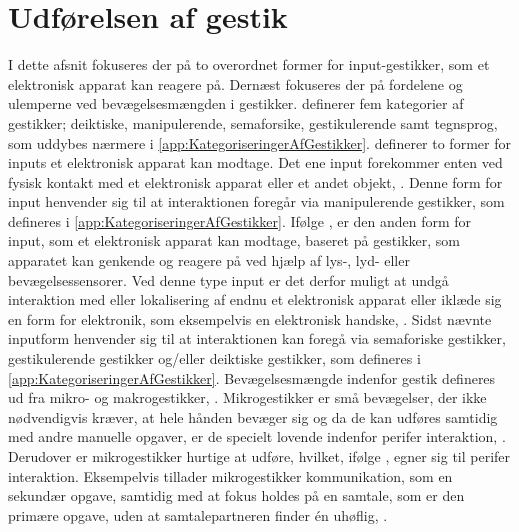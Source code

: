 \section{Udførelsen af gestik}
\label{UdfoerelseAfGestik}
%
I dette afsnit fokuseres der på to overordnet former for input-gestikker, som et elektronisk apparat kan reagere på. Dernæst fokuseres der på fordelene og ulemperne ved bevægelsesmængden i gestikker. \textcite[s. 9]{PDF:ATaxonomyOfGestures} definerer fem kategorier af gestikker; deiktiske, manipulerende, semaforsike, gestikulerende samt tegnsprog, som uddybes nærmere i \autoref{app:KategoriseringerAfGestikker}. \blankline
%
\textcite[s. 9]{PDF:ATaxonomyOfGestures} definerer to former for inputs et elektronisk apparat kan modtage. Det ene input forekommer enten ved fysisk kontakt med et elektronisk apparat eller et andet objekt, \parencite[s. 10]{PDF:ATaxonomyOfGestures}. Denne form for input henvender sig til at interaktionen foregår via manipulerende gestikker, som defineres i \autoref{app:KategoriseringerAfGestikker}. Ifølge \textcite[s. 12]{PDF:ATaxonomyOfGestures}, er den anden form for input, som et elektronisk apparat kan modtage, baseret på gestikker, som apparatet kan genkende og reagere på ved hjælp af lys-, lyd- eller bevægelsessensorer. Ved denne type input er det derfor muligt at undgå interaktion med eller lokalisering af endnu et elektronisk apparat eller iklæde sig en form for elektronik, som eksempelvis en elektronisk handske, \parencite[s. 12]{PDF:ATaxonomyOfGestures}. Sidst nævnte inputform henvender sig til at interaktionen kan foregå via semaforiske gestikker, gestikulerende gestikker og/eller deiktiske gestikker, som defineres i \autoref{app:KategoriseringerAfGestikker}. \blankline
%
Bevægelsesmængde indenfor gestik defineres ud fra mikro- og makrogestikker, \parencite[s. 6]{PDF:UsabilityofMicroVsMacroGestures}. Mikrogestikker er små bevægelser, der ikke nødvendigvis kræver, at hele hånden bevæger sig og da de kan udføres samtidig med andre manuelle opgaver, er de specielt lovende indenfor perifer interaktion, \parencite[s. 95]{PDF:PIMicrogesturesKap5}. Derudover er mikrogestikker hurtige at udføre, hvilket, ifølge \textcite[s. 96]{PDF:PIMicrogesturesKap5}, egner sig til perifer interaktion. Eksempelvis tillader mikrogestikker kommunikation, som en sekundær opgave, samtidig med at fokus holdes på en samtale, som er den primære opgave, uden at samtalepartneren finder én uhøflig, \parencite[s. 97]{PDF:PIMicrogesturesKap5}.


